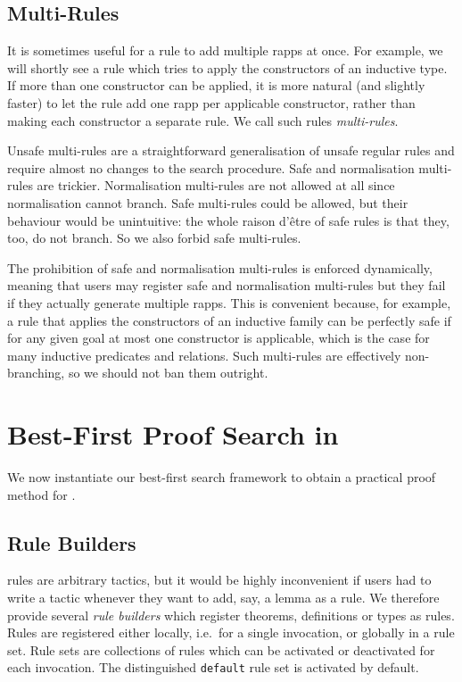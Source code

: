 \subsection{Multi-Rules}

It is sometimes useful for a rule to add multiple rapps at once. For example, we
will shortly see a rule which tries to apply the constructors of an inductive
type. If more than one constructor can be applied, it is more natural (and
slightly faster) to let the rule add one rapp per applicable constructor, rather
than making each constructor a separate rule. We call such rules
\emph{multi-rules}.

Unsafe multi-rules are a straightforward generalisation of unsafe regular rules
and require almost no changes to the search procedure. Safe and normalisation
multi-rules are trickier. Normalisation multi-rules are not allowed at all since
normalisation cannot branch. Safe multi-rules could be allowed, but their
behaviour would be unintuitive: the whole raison d'être of safe rules is that
they, too, do not branch. So we also forbid safe multi-rules.

The prohibition of safe and normalisation multi-rules is enforced dynamically,
meaning that users may register safe and normalisation multi-rules but they fail
if they actually generate multiple rapps. This is convenient because, for
example, a rule that applies the constructors of an inductive family can be
perfectly safe if for any given goal at most one constructor is applicable,
which is the case for many inductive predicates and relations. Such multi-rules
are effectively non-branching, so we should not ban them outright.


\section{Best-First Proof Search in \Lean}%
\label{sec:concrete-framework}

We now instantiate our best-first search framework to obtain a practical proof
method for \Lean.


\subsection{Rule Builders}%
\label{sec:rule-builders}

\Aesop{} rules are arbitrary tactics, but it would be highly inconvenient if
users had to write a tactic whenever they want to add, say, a lemma as a rule.
We therefore provide several \emph{rule builders} which register theorems,
definitions or types as rules. Rules are registered either locally, i.e.\ for a
single \Aesop{} invocation, or globally in a rule set. Rule sets are collections
of rules which can be activated or deactivated for each \Aesop{} invocation. The
distinguished \texttt{default} rule set is activated by default.


